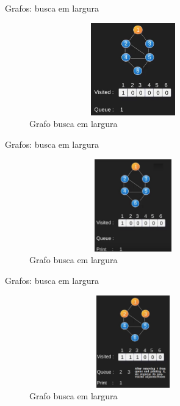 \begin{frame}
	\begin{block}{Grafos: busca em largura}
		\begin{figure}[!htb]
			\centering	  
			\includegraphics[height=4cm, width = 9cm]{./pic/bfs2.png}
			\caption{Grafo busca em largura \cite{GEEKS_2018}}
		\end{figure}
	\end{block}
\end{frame}

\begin{frame}
	\begin{block}{Grafos: busca em largura}
		\begin{figure}[!htb]
			\centering	  
			\includegraphics[height=4cm, width = 9cm]{./pic/bfs3.png}
			\caption{Grafo busca em largura \cite{GEEKS_2018}}
		\end{figure}
	\end{block}
\end{frame}

\begin{frame}
	\begin{block}{Grafos: busca em largura}
		\begin{figure}[!htb]
			\centering	  
			\includegraphics[height=4cm, width = 9cm]{./pic/bfs4.png}
			\caption{Grafo busca em largura \cite{GEEKS_2018}}
		\end{figure}
	\end{block}
\end{frame}

